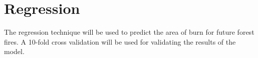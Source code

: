 \section{Regression}
The regression technique will be used to predict the area of burn for future forest fires. A 10-fold cross validation will be used for validating the results of the model.